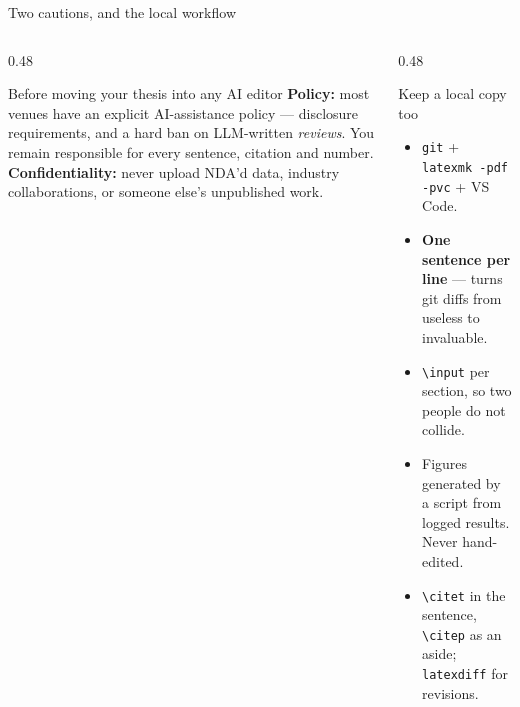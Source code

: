 \documentclass[aspectratio=169,11pt]{beamer}
\newcommand{\code}[1]{\texttt{\small #1}}
\newcommand{\key}[1]{\textbf{\color{brand}#1}}
\begin{document}
\begin{frame}{Two cautions, and the local workflow}
\begin{columns}[T]
\begin{column}{0.48\textwidth}
\begin{alertblock}{Before moving your thesis into any AI editor}
\footnotesize
\key{Policy:} most venues have an explicit AI-assistance policy --- disclosure
requirements, and a hard ban on LLM-written \emph{reviews}. You remain
responsible for every sentence, citation and number.\\[4pt]
\key{Confidentiality:} never upload NDA'd data, industry collaborations, or
someone else's unpublished work.
\end{alertblock}
\end{column}
\begin{column}{0.48\textwidth}
\begin{block}{Keep a local copy too}
\footnotesize
\begin{itemize}
  \item \code{git} + \code{latexmk -pdf -pvc} + VS Code.
  \item \key{One sentence per line} --- turns git diffs from useless to
        invaluable.
  \item \code{\textbackslash input} per section, so two people do not collide.
  \item Figures generated by a script from logged results. Never hand-edited.
  \item \code{\textbackslash citet} in the sentence, \code{\textbackslash citep}
        as an aside; \code{latexdiff} for revisions.
\end{itemize}
\end{block}
\end{column}
\end{columns}
\end{frame}
\end{document}
